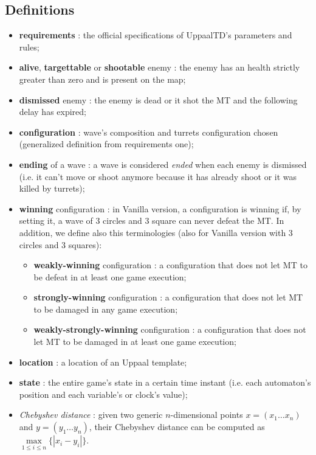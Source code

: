 \documentclass[
10pt, %
a4paper, %
oneside, %
headinclude,footinclude, %
BCOR5mm, %
]{scrartcl}
\begin{document}
		\subsection{Definitions}
			\begin{itemize}
				\item \textbf{requirements} : the official specifications of UppaalTD's parameters and rules;
				\item \textbf{alive}, \textbf{targettable} or \textbf{shootable} enemy : the enemy has an health strictly greater than zero and is present on the map;
				\item \textbf{dismissed} enemy : the enemy is dead or it shot the MT and the following delay has expired;
				\item \textbf{configuration} : wave's composition and turrets configuration chosen (generalized definition from requirements one);
				\item \textbf{ending} of a wave : a wave is considered \emph{ended} when each enemy is dismissed (i.e. it can't move or shoot anymore because it has already shoot or it was killed by turrets);
				\item \textbf{winning} configuration : in Vanilla version, a configuration is winning if, by setting it, a wave of 3 circles and 3 square can never defeat the MT. In addition, we define also this terminologies (also for Vanilla version with 3 circles and 3 squares):
					\begin{itemize}
						\item \textbf{weakly-winning} configuration : a configuration that does not let MT to be defeat in at least one game execution;
						\item \textbf{strongly-winning} configuration : a configuration that does not let MT to be damaged in any game execution;
						\item \textbf{weakly-strongly-winning} configuration : a configuration that does not let MT to be damaged in at least one game execution;
					\end{itemize}
				\item \textbf{location} : a location of an Uppaal template;
				\item \textbf{state} : the entire game's state in a certain time instant (i.e. each automaton's position and each variable's or clock's value);
				\item \emph{Chebyshev distance} : given two generic $n$-dimensional points $x=(x_1 \dots x_n)$ and $y=(y_1 \dots y_n)$, their Chebyshev distance can be computed as $\max\limits_{1\leq i\leq n}\{|x_i - y_i|\}$.
			\end{itemize}					
\end{document}
